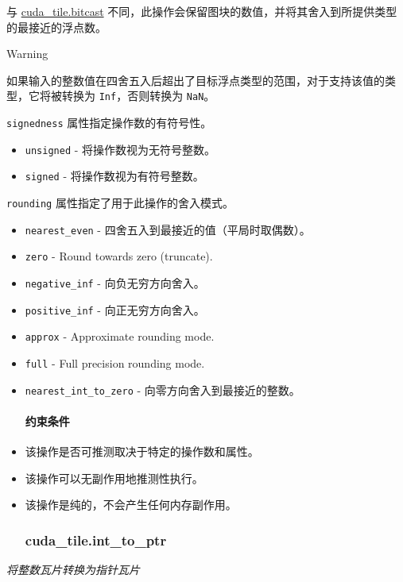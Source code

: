 \documentclass{article}
\begin{document}
与 \href{https://docs.nvidia.com/cuda/tile-ir/latest/sections/operations.html#op-cuda-tile-bitcast}{cuda\_tile.bitcast} 不同，此操作会保留图块的数值，并将其舍入到所提供类型的最接近的浮点数。


Warning


如果输入的整数值在四舍五入后超出了目标浮点类型的范围，对于支持该值的类型，它将被转换为 \texttt{Inf}，否则转换为 \texttt{NaN}。


\texttt{signedness} 属性指定操作数的有符号性。


\begin{itemize}
\item \texttt{unsigned} - 将操作数视为无符号整数。
\item \texttt{signed} - 将操作数视为有符号整数。

\end{itemize}
\texttt{rounding} 属性指定了用于此操作的舍入模式。


\begin{itemize}
\item \texttt{nearest\_even} - 四舍五入到最接近的值（平局时取偶数）。
\item \texttt{zero} - Round towards zero (truncate).
\item \texttt{negative\_inf} - 向负无穷方向舍入。
\item \texttt{positive\_inf} - 向正无穷方向舍入。
\item \texttt{approx} - Approximate rounding mode.
\item \texttt{full} - Full precision rounding mode.
\item \texttt{nearest\_int\_to\_zero} - 向零方向舍入到最接近的整数。


\paragraph{约束条件}

\item 该操作是否可推测取决于特定的操作数和属性。
\item 该操作可以无副作用地推测性执行。
\item 该操作是纯的，不会产生任何内存副作用。


\subsubsection{cuda\_tile.int\_to\_ptr}

\end{itemize}
\textit{将整数瓦片转换为指针瓦片}
\end{document}

